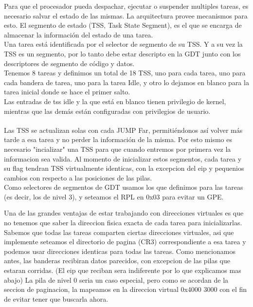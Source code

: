 Para que el procesador pueda despachar, ejecutar o suspender multiples tareas, es necesario salvar el estado de las mismas. La arquitectura provee mecanismos para esto. El segmento de estado (TSS, Task State Segment), es el que se encarga de almacenar la informaci\'on del estado de una tarea.\\

Una tarea est\'a identificada por el selector de segmento de su TSS. Y a su vez la TSS es un segmento, por lo tanto debe estar descripto en la GDT junto con los descriptores de segmento de c\'odigo y datos.\\

Tenemos 8 tareas y definimos un total de 18 TSS, uno para cada tarea, uno para cada bandera de tarea, uno para la tarea Idle, y otro lo dejamos en blanco para la tarea inicial donde se hace el primer salto.\\
Las entradas de tss idle y la que est\'a en blanco tienen privilegio de kernel, mientras que las dem\'as est\'an configuradas con privilegios de usuario.\\
\\
Las TSS se actualizan solas con cada JUMP Far, permiti\'endonos as\'i volver m\'as tarde a esa tarea y no perder la informaci\'on de la misma. Por esto mismo es necesario "incializar" una TSS para que cuando entremos por primera vez la informacion
sea valida. Al momento de inicializar estos segmentos, cada tarea y su flag tendran TSS virtualmente identicas, con la excepcion del eip y pequenios cambios con respecto a las posiciones de las pilas.\\

Como selectores de segmentos de GDT usamos los que definimos para las tareas (es decir, los de nivel 3), y seteamos el RPL en 0x03 para evitar un GPE. 

Una de las grandes ventajas de estar trabajando con direcciones virtuales es que no tenemos que saber la direccion fisica exacta de cada tarea para inicializarlas. 
Sabemos que todas las tareas comparten ciertas direcciones virtuales, asi que implemente seteamos el directorio de pagina (CR3) correspondiente a esa tarea y podemos usar direcciones identicas para todas las tareas.
Como mencionamos antes, las banderas recibiran datos parecidos, con excepcion de las pilas que estaran corridas. (El eip que reciban sera indiferente por lo que explicamos mas abajo)
La pila de nivel 0 seria un caso especial, pero como se acordan de la seccion de paginacion, la mapeamos en la direccion virtual 0x4000 3000 con el fin de evitar tener que buscarla ahora.

